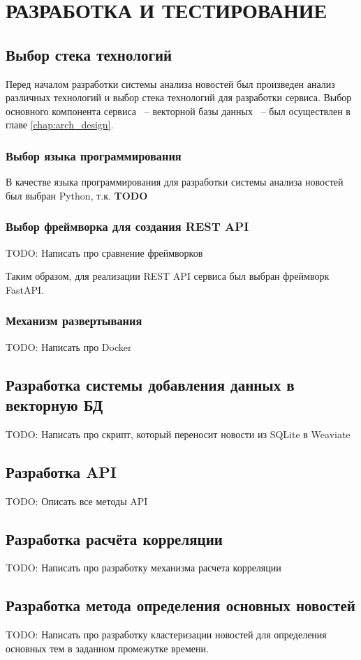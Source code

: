 \chapter{РАЗРАБОТКА И ТЕСТИРОВАНИЕ}
\aftertitle

\section{Выбор стека технологий}

Перед началом разработки системы анализа новостей был произведен анализ различных технологий и выбор стека технологий для разработки сервиса. Выбор основного компонента сервиса ~-- векторной базы данных ~-- был осуществлен в главе \ref{chap:arch_design}.

\subsection{Выбор языка программирования}

В качестве языка программирования для разработки системы анализа новостей был выбран Python, т.к. \textbf{TODO}


\subsection{Выбор фреймворка для создания REST API}

TODO: Написать про сравнение фреймворков

Таким образом, для реализации REST API сервиса был выбран фреймворк FastAPI.

\subsection{Механизм развертывания}

TODO: Написать про Docker

\section{Разработка системы добавления данных в векторную БД}

TODO: Написать про скрипт, который переносит новости из SQLite в Weaviate

\section{Разработка API}

TODO: Описать все методы API

\section{Разработка расчёта корреляции}

TODO: Написать про разработку механизма расчета корреляции

\section{Разработка метода определения основных новостей}

TODO: Написать про разработку кластеризации новостей для определения основных тем в заданном промежутке времени.
